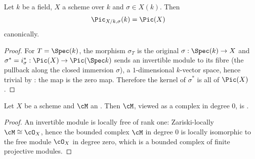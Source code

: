 \begin{lemma}[$\Pic_{X/k,\sigma}$ at $T=\Spec(k)$]\label{lem:pc-sigma-k-points}
Let $k$ be a field, $X$ a scheme over $k$ and $\sigma\in X(k)$.  Then
\[
\Pic_{X/k,\sigma}(k)=\Pic(X)
\]
canonically.
\end{lemma}
\begin{proof}
For $T=\Spec(k)$, the morphism $\sigma_T$ is the original
$\sigma:\Spec(k)\to X$ and $\sigma^*=i_\sigma^*:\Pic(X)\to\Pic(\Spec k)$
sends an invertible module to its fibre (the pullback along the closed
immersion $\sigma$), a $1$-dimensional $k$-vector space, hence trivial
by : the map is the zero map.  Therefore the
kernel of $\sigma^*$ is all of $\Pic(X)$.
\end{proof}

\begin{lemma}\label{lem:pc-invertible-perfect}
Let $X$ be a scheme and $\cM$ an
.  Then
$\cM$, viewed as a complex in degree $0$, is
.
\end{lemma}
\begin{proof}
An invertible module is locally free of rank one: Zariski-locally
$\cM\cong\cO_X$, hence the bounded complex $\cM$ in degree $0$ is
locally isomorphic to the free module $\cO_X$ in degree zero, which is
a bounded complex of finite projective modules.
\end{proof}

